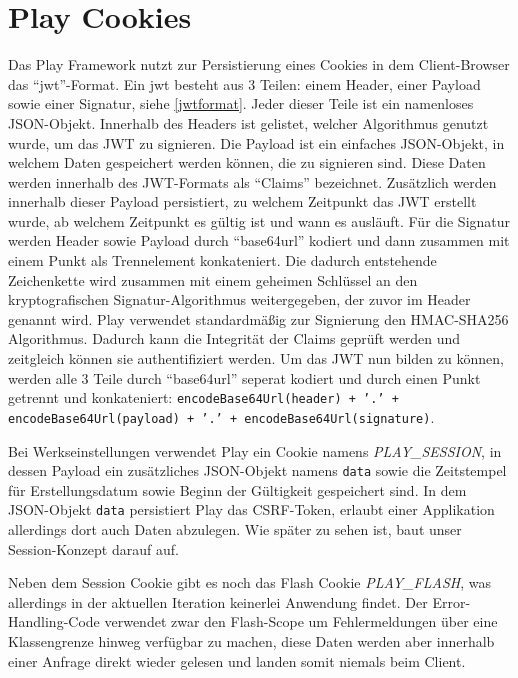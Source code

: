 \documentclass[12pt,DIV14,BCOR10mm,a4paper,parskip=half-,headsepline,headinclude,english,ngerman,bibliography=totocnumbered]{scrreprt}
\begin{document}
\section{Play Cookies}
\label{play:cookies}
Das Play Framework nutzt zur Persistierung eines Cookies in dem Client-Browser das \enquote{\gls{jwt}}-Format.
Ein \gls{jwt} besteht aus 3 Teilen: einem Header, einer Payload sowie einer Signatur, siehe \ref{jwtformat}.
Jeder dieser Teile ist ein namenloses JSON-Objekt.
Innerhalb des Headers ist gelistet, welcher Algorithmus genutzt wurde, um das JWT zu signieren.
Die Payload ist ein einfaches JSON-Objekt, in welchem Daten gespeichert werden können, die zu signieren sind.
Diese Daten werden innerhalb des JWT-Formats als \enquote{Claims} bezeichnet.
Zusätzlich werden innerhalb dieser Payload persistiert, zu welchem Zeitpunkt das JWT erstellt wurde, ab welchem Zeitpunkt es gültig ist und wann es ausläuft.
Für die Signatur werden Header sowie Payload durch \enquote{base64url} kodiert und dann zusammen mit einem Punkt als Trennelement konkateniert. Die dadurch entstehende Zeichenkette wird zusammen mit einem geheimen Schlüssel an den kryptografischen Signatur-Algorithmus weitergegeben, der zuvor im Header genannt wird.
Play verwendet standardmäßig zur Signierung den HMAC-SHA256 Algorithmus.
Dadurch kann die Integrität der Claims geprüft werden und zeitgleich können sie authentifiziert werden.
Um das JWT nun bilden zu können, werden alle 3 Teile durch \enquote{base64url} seperat kodiert und durch einen Punkt getrennt und konkateniert: \texttt{encodeBase64Url(header) + '.' + encodeBase64Url(payload) + '.' + encodeBase64Url(signature)}.
\par
Bei Werkseinstellungen verwendet Play ein Cookie namens \textit{PLAY\_SESSION}, in dessen Payload ein zusätzliches JSON-Objekt namens \texttt{data} sowie die Zeitstempel für Erstellungsdatum sowie Beginn der Gültigkeit gespeichert sind.
In dem JSON-Objekt \texttt{data} persistiert Play das CSRF-Token, erlaubt einer Applikation allerdings dort auch Daten abzulegen.
Wie später zu sehen ist, baut unser Session-Konzept darauf auf.

Neben dem Session Cookie gibt es noch das Flash Cookie \textit{PLAY\_FLASH}, was allerdings in der aktuellen Iteration keinerlei Anwendung findet. Der Error-Handling-Code verwendet zwar den Flash-Scope um Fehlermeldungen über eine Klassengrenze hinweg verfügbar zu machen, diese Daten werden aber innerhalb einer Anfrage direkt wieder gelesen und landen somit niemals beim Client.
\end{document}
